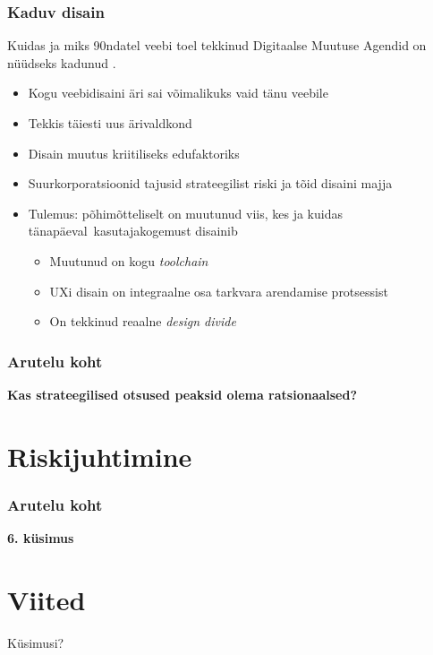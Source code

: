 \begin{frame}[fragile]
  \frametitle{Kaduv disain}
  Kuidas ja miks 90ndatel veebi toel tekkinud Digitaalse Muutuse Agendid on nüüdseks kadunud \citep{design}. 
	\begin{itemize}
		\item Kogu veebidisaini äri sai võimalikuks vaid tänu veebile
		\item Tekkis täiesti uus ärivaldkond
		\item Disain muutus kriitiliseks edufaktoriks
		\item Suurkorporatsioonid tajusid strateegilist riski ja tõid disaini majja
		\item Tulemus: põhimõtteliselt on muutunud viis, kes ja kuidas tänapäeval kasutajakogemust disainib
		\begin{itemize}
			\item Muutunud on kogu \emph{toolchain}
			\item UXi disain on integraalne osa tarkvara arendamise protsessist
			\item On tekkinud reaalne \emph{design divide}
		\end{itemize}		
	\end{itemize}
\end{frame}

\begin{frame}[fragile]
  \frametitle{Arutelu koht}
		\begin{center}
			\textbf{Kas strateegilised otsused peaksid olema ratsionaalsed?}
		\end{center}
\end{frame}

\section{Riskijuhtimine}
\begin{frame}[fragile]
  \frametitle{Arutelu koht}
		\begin{center}
			\textbf{6. küsimus}
		\end{center}
\end{frame}


\section{Viited}

\begin{frame}[t,allowframebreaks,]
  	
	 

\end{frame}

\begin{frame}[plain]
	\begin{center}Küsimusi?\end{center}
\end{frame}


